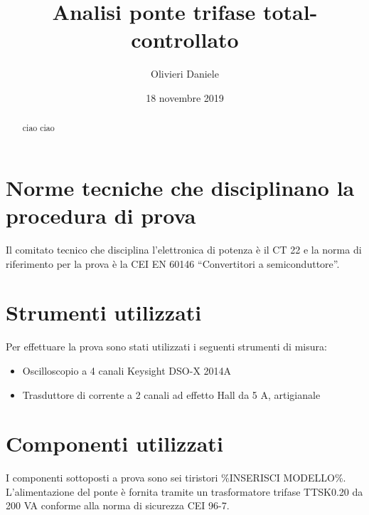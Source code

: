 \documentclass[a4paper,10pt]{article}
\title{Analisi ponte trifase total-controllato}
\author{Olivieri Daniele}
\date{18 novembre 2019}
\begin{document}
\maketitle

\begin{abstract}
 ciao ciao
\end{abstract}

\section{Norme tecniche che disciplinano la procedura di prova}
Il comitato tecnico che disciplina l'elettronica di potenza è il CT 22 e la norma
di riferimento per la prova è la CEI EN 60146 ``Convertitori a semiconduttore''.

\section{Strumenti utilizzati}
Per effettuare la prova sono stati utilizzati i seguenti strumenti di misura:
\begin{itemize}
 \item Oscilloscopio a 4 canali Keysight DSO-X 2014A
 \item Trasduttore di corrente a 2 canali ad effetto Hall da 5 A, artigianale
\end{itemize}

\section{Componenti utilizzati}
I componenti sottoposti a prova sono sei tiristori \%INSERISCI MODELLO\%.
L'alimentazione del ponte è fornita tramite un trasformatore trifase TTSK0.20 da 200 VA 
conforme alla norma di sicurezza CEI 96-7.
\end{document}
